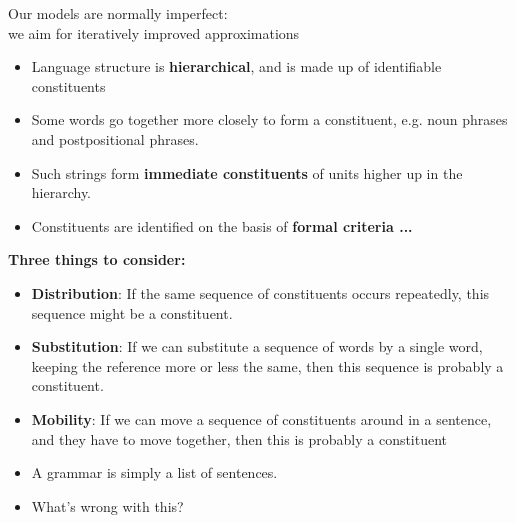 \documentclass[a4paper,landscape,headrule,footrule]{foils}
\newenvironment{block}[1]%
  {%
    \par\medskip
    \noindent\textbf{#1}\par}%
  {%
    \medskip
  }
\begin{document}
\begin{center}
  Our models are normally imperfect: \\
we aim for iteratively improved approximations
\end{center}


\begin{block}{}
  \begin{itemize}
  \item
    Language structure is \textbf{hierarchical}, and is made up of identifiable constituents
  \item
    Some words go together more closely to form a constituent, e.g. noun phrases and postpositional phrases.  
  \item
   Such strings form \textbf{immediate constituents} of units higher up in the hierarchy.
\item
    Constituents are identified on the basis of \textbf{formal criteria ...}
  \end{itemize}
\end{block}

\begin{block}{Three things to consider:}
  \begin{itemize}
  \item
    \textbf{Distribution}: If the same sequence of constituents occurs repeatedly, this sequence might be a constituent.  
  \item
    \textbf{Substitution}: If we can substitute a sequence of words by a single word, keeping the reference more or less the same, then this sequence is probably a constituent.
  \item
    \textbf{Mobility}: If we can move a sequence of constituents around in a sentence, and they have to move together, then this is probably a constituent
  \end{itemize}
\end{block}






\begin{itemize}
\item A grammar is simply a list of sentences.
\item What’s wrong with this?
\end{itemize}
\end{document}
